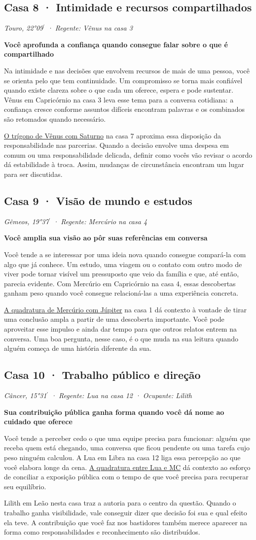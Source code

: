 \documentclass[11pt,a4paper]{article}
\newcommand{\leitura}[3]{\subsection{#1}\textit{#2}\par #3}
\newcommand{\subtituloleitura}[1]{\textbf{#1}\par\nopagebreak[4]}
\newcommand{\aspectoref}[2]{\hyperref[#1]{#2}}
\begin{document}
\leitura{Casa 8 · Intimidade e recursos compartilhados}{Touro, 22°09\ensuremath{^{\prime}} · Regente: Vênus na casa 3}{
\subtituloleitura{Você aprofunda a confiança quando consegue falar sobre o que é compartilhado}
Na intimidade e nas decisões que envolvem recursos de mais de uma pessoa, você se orienta pelo que tem continuidade. Um compromisso se torna mais confiável quando existe clareza sobre o que cada um oferece, espera e pode sustentar. Vênus em Capricórnio na casa 3 leva esse tema para a conversa cotidiana: a confiança cresce conforme assuntos difíceis encontram palavras e os combinados são retomados quando necessário.

\aspectoref{aspecto:venus-saturno}{O trígono de Vênus com Saturno} na casa 7 aproxima essa disposição da responsabilidade nas parcerias. Quando a decisão envolve uma despesa em comum ou uma responsabilidade delicada, definir como vocês vão revisar o acordo dá estabilidade à troca. Assim, mudanças de circunstância encontram um lugar para ser discutidas.
}

\leitura{Casa 9 · Visão de mundo e estudos}{Gêmeos, 19°37\ensuremath{^{\prime}} · Regente: Mercúrio na casa 4}{
\subtituloleitura{Você amplia sua visão ao pôr suas referências em conversa}
Você tende a se interessar por uma ideia nova quando consegue compará-la com algo que já conhece. Um estudo, uma viagem ou o contato com outro modo de viver pode tornar visível um pressuposto que veio da família e que, até então, parecia evidente. Com Mercúrio em Capricórnio na casa 4, essas descobertas ganham peso quando você consegue relacioná-las a uma experiência concreta.

\aspectoref{aspecto:mercurio-jupiter}{A quadratura de Mercúrio com Júpiter} na casa 1 dá contexto à vontade de tirar uma conclusão ampla a partir de uma descoberta importante. Você pode aproveitar esse impulso e ainda dar tempo para que outros relatos entrem na conversa. Uma boa pergunta, nesse caso, é o que muda na sua leitura quando alguém começa de uma história diferente da sua.
}

\leitura{Casa 10 · Trabalho público e direção}{Câncer, 15°31\ensuremath{^{\prime}} · Regente: Lua na casa 12 · Ocupante: Lilith}{
\label{casa-10}\subtituloleitura{Sua contribuição pública ganha forma quando você dá nome ao cuidado que oferece}
Você tende a perceber cedo o que uma equipe precisa para funcionar: alguém que receba quem está chegando, uma conversa que ficou pendente ou uma tarefa cujo peso ninguém calculou. A Lua em Libra na casa 12 liga essa percepção ao que você elabora longe da cena. \aspectoref{aspecto:mc-lua}{A quadratura entre Lua e MC} dá contexto ao esforço de conciliar a exposição pública com o tempo de que você precisa para recuperar seu equilíbrio.

Lilith em Leão nesta casa traz a autoria para o centro da questão. Quando o trabalho ganha visibilidade, vale conseguir dizer que decisão foi sua e qual efeito ela teve. A contribuição que você faz nos bastidores também merece aparecer na forma como responsabilidades e reconhecimento são distribuídos.
}
\end{document}
